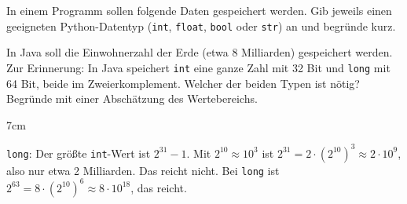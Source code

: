 \question[5]
In einem Programm sollen folgende Daten gespeichert werden. Gib jeweils einen geeigneten Python-Datentyp
(\texttt{int}, \texttt{float}, \texttt{bool} oder \texttt{str}) an und begründe kurz.
In Java soll die Einwohnerzahl der Erde (etwa 8 Milliarden) gespeichert werden.
Zur Erinnerung: In Java speichert \texttt{int} eine ganze Zahl mit 32 Bit und \texttt{long} mit 64 Bit,
beide im Zweierkomplement. Welcher der beiden Typen ist nötig? Begründe mit einer Abschätzung des Wertebereichs.

\begin{solutionbox}{7cm}
\texttt{long}: Der größte \texttt{int}-Wert ist $2^{31} - 1$. Mit $2^{10} \approx 10^3$ ist
$2^{31} = 2 \cdot (2^{10})^3 \approx 2 \cdot 10^9$, also nur etwa 2 Milliarden. Das reicht nicht.
Bei \texttt{long} ist $2^{63} = 8 \cdot (2^{10})^6 \approx 8 \cdot 10^{18}$, das reicht.
\end{solutionbox}
